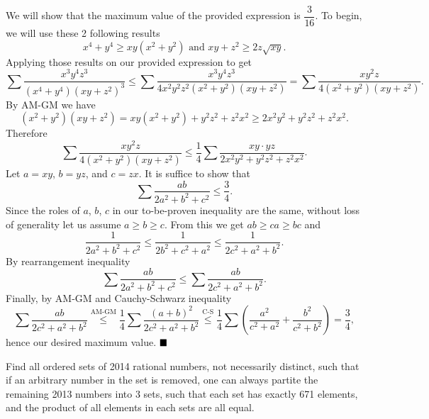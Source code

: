 \documentclass[11pt]{article}
\newenvironment{solution}[1][Solution]{%
  \proof[\normalfont \faPenNib \hspace{0.2cm} \ttfamily \scshape \large #1]%
}{\(\hfill \blacksquare\){\parfillskip0pt\par}}
\theoremstyle{definition}
\begin{document}
        \begin{solution}
            We will show that the maximum value of the provided expression is \(\dfrac{3}{16}\). To begin, we will use these 2 following results
            \[x^4 + y^4 \geq xy(x^2 + y^2) \text{\ \ and \ } xy + z^2 \geq 2z\sqrt{xy}.\]
            Applying those results on our provided expression to get
            \[\sum \frac{x^3y^4z^3}{(x^4 + y^4)(xy + z^2)^3} \leq \sum \frac{x^3y^4z^3}{4x^2y^2z^2(x^2 + y^2)(xy + z^2)} = \sum \frac{xy^2z}{4(x^2 + y^2)(xy + z^2)}.\]
            By AM-GM we have
            \[(x^2 + y^2)(xy + z^2) = xy(x^2 + y^2) + y^2z^2 + z^2x^2 \geq 2x^2y^2 + y^2z^2 + z^2x^2.\]
            Therefore
            \[\sum \frac{xy^2z}{4(x^2 + y^2)(xy + z^2)} \leq \frac{1}{4} \sum \frac{xy \cdot yz}{2x^2y^2 + y^2z^2 + z^2x^2}.\]
            Let \(a = xy\), \(b = yz\), and \(c = zx\). It is suffice to show that
            \[\sum \frac{ab}{2a^2 + b^2 + c^2} \leq \frac{3}{4}.\]
            Since the roles of \(a\), \(b\), \(c\) in our to-be-proven inequality are the same, without loss of generality let us assume \(a \geq b \geq c\). From this we get \(ab \geq ca \geq bc\) and
            \[\frac{1}{2a^2 + b^2 + c^2} \leq \frac{1}{2b^2 + c^2 + a^2} \leq \frac{1}{2c^2 + a^2 + b^2}.\]
            By rearrangement inequality
            \[\sum \frac{ab}{2a^2 + b^2 + c^2} \leq \sum \frac{ab}{2c^2 + a^2 + b^2}.\]
            Finally, by AM-GM and Cauchy-Schwarz inequality
            \[\sum \frac{ab}{2c^2 + a^2 + b^2} \stackrel{\text{AM-GM}}{\leq} \frac{1}{4} \sum \frac{(a + b)^2}{2c^2 + a^2 + b^2} \stackrel{\text{C-S}}{\leq} \frac{1}{4} \sum \left( \frac{a^2}{c^2 + a^2} + \frac{b^2}{c^2 + b^2} \right) = \frac{3}{4},\]
            hence our desired maximum value.
        \end{solution}

        \newpage

        \begin{problem}
            Find all ordered sets of 2014 rational numbers, not necessarily distinct, such that if an arbitrary number in the set is removed, one can always partite the remaining 2013 numbers into 3 sets, such that each set has exactly 671 elements, and the product of all elements in each sets are all equal.
        \end{problem}
\end{document}
